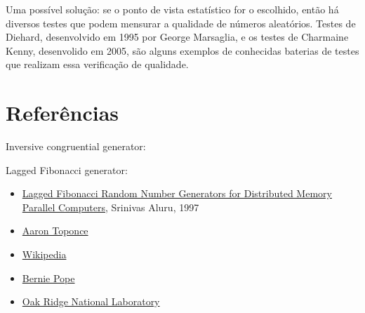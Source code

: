 \documentclass[12pt]{article}
\begin{document}
Uma possível solução: se o ponto de vista estatístico for o escolhido, então há
diversos testes que podem mensurar a qualidade de números aleatórios. Testes de
Diehard, desenvolvido em 1995 por George Marsaglia, e os testes de Charmaine
Kenny, desenvolido em 2005, são alguns exemplos de conhecidas baterias de testes
que realizam essa verificação de qualidade.

\section{Referências}
Inversive congruential generator:

Lagged Fibonacci generator:
\begin{itemize}
  \item
    \href{http://astro.uchicago.edu/~andrey/classes/rseminar/docs/aluru.pdf}
    {Lagged Fibonacci Random Number Generators for Distributed Memory Parallel
    Computers}, Srinivas Aluru, 1997
  \item \href{https://pthree.org/2015/05/29/the-lagged-fibonacci-generator/}
    {Aaron Toponce}
  \item \href{https://en.wikipedia.org/wiki/Lagged_Fibonacci_generator}
    {Wikipedia}
  \item \href{http://berniepope.id.au/lfg.html}{Bernie Pope}
  \item \href{https://www.phy.ornl.gov/csep/rn/node20.html}{Oak Ridge National
    Laboratory}
\end{itemize}
\end{document}

